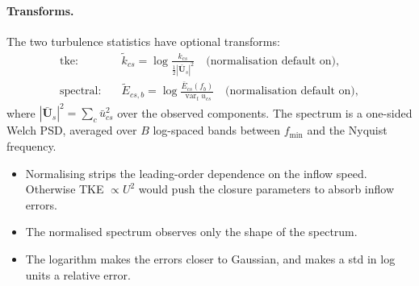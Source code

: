 \documentclass[11pt,a4paper]{article}
\begin{document}
\paragraph{Transforms.} The two turbulence statistics have optional
transforms:
\begin{align}
  \text{tke:}\quad &
  \tilde k_{cs} = \log \frac{k_{cs}}{\tfrac12 |\bar{\bm U}_s|^2}
  \quad\text{(normalisation default on)}, \\
  \text{spectral:}\quad &
  \tilde E_{cs,b} = \log \frac{\bar E_{cs}(f_b)}{\operatorname{var}_t u_{cs}}
  \quad\text{(normalisation default on)},
\end{align}
where $|\bar{\bm U}_s|^2 = \sum_c \bar u_{cs}^2$ over the observed
components. The spectrum is a one-sided Welch PSD, averaged over $B$
log-spaced bands between $f_{\min}$ and the Nyquist frequency.
\begin{itemize}
\item Normalising strips the leading-order dependence on the inflow speed.
  Otherwise TKE $\propto U^2$ would push the closure parameters to absorb inflow
  errors.
\item The normalised spectrum observes only the shape of the spectrum.
\item The logarithm makes the errors closer to Gaussian, and makes a std in
  log units a relative error.
\end{itemize}
\end{document}
